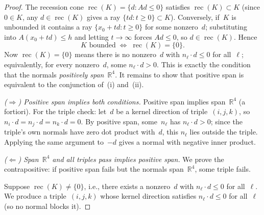 \begin{proof}
The recession cone $\operatorname{rec}(K) = \{d : Ad \le 0\}$ satisfies
$\operatorname{rec}(K) \subset K$ (since $0 \in K$, any $d \in
\operatorname{rec}(K)$ gives a ray $\{td : t \ge 0\} \subset K$).
Conversely, if~$K$ is unbounded it contains a ray $\{x_0 + td : t \ge 0\}$
for some nonzero~$d$; substituting into $A(x_0 + td) \le h$ and letting
$t \to \infty$ forces $Ad \le 0$, so $d \in \operatorname{rec}(K)$.  Hence
\[
  K \text{ bounded}
  \;\Longleftrightarrow\;
  \operatorname{rec}(K) = \{0\}.
\]
Now $\operatorname{rec}(K) = \{0\}$ means there is no nonzero~$d$ with
$n_\ell \cdot d \le 0$ for all~$\ell$; equivalently, for every nonzero~$d$,
some $n_\ell \cdot d > 0$.  This is exactly the condition that the normals
\emph{positively span}~$\mathbb{R}^4$.  It remains to show that positive span
is equivalent to the conjunction of~\textup{(i)} and~\textup{(ii)}.

\medskip\noindent\emph{($\Rightarrow$) Positive span implies both conditions.}
Positive span implies span~$\mathbb{R}^4$ (a fortiori). For the triple check:
let~$d$ be a kernel direction of triple~$(i,j,k)$, so $n_i \cdot d = n_j
\cdot d = n_k \cdot d = 0$. By positive span, some~$n_\ell$ has $n_\ell \cdot
d > 0$; since the triple's own normals have zero dot product with~$d$, this
$n_\ell$ lies outside the triple. Applying the same argument to~$-d$ gives a
normal with negative inner product.

\medskip\noindent\emph{($\Leftarrow$) Span~$\mathbb{R}^4$ and all triples
pass implies positive span.}
We prove the contrapositive: if positive span fails but the normals
span~$\mathbb{R}^4$, some triple fails.

Suppose $\operatorname{rec}(K) \neq \{0\}$, i.e., there exists a nonzero~$d$
with $n_\ell \cdot d \le 0$ for all~$\ell$. We produce a triple~$(i,j,k)$
whose kernel direction satisfies $n_\ell \cdot d \le 0$ for all~$\ell$
(so no normal blocks it).


\end{proof}
